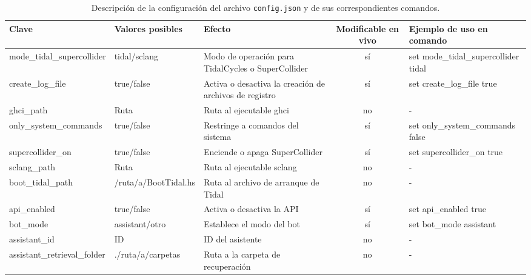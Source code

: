 \begin{landscape}
    \begin{table}[htbp]
        \centering
        \caption{Descripción de la configuración del archivo \texttt{config.json} y de sus correspondientes comandos.}
        \label{tab:config-description}
        \fontsize{9.5pt}{11pt}\selectfont
        \begin{tabularx}{\linewidth}{lXlcl}
            \toprule
            \rowcolor{azul_unir} %
            \textbf{Clave} & \textbf{Valores posibles} & \textbf{Efecto} & \textbf{Modificable en vivo} & \textbf{Ejemplo de uso en comando} \\
            \midrule
        mode\_tidal\_supercollider & tidal/sclang & Modo de operación para TidalCycles o SuperCollider & sí & set mode\_tidal\_supercollider tidal \\
        create\_log\_file & \textcolor{truecolor}{true}/\textcolor{falsecolor}{false} & Activa o desactiva la creación de archivos de registro & sí & set create\_log\_file \textcolor{truecolor}{true} \\
        ghci\_path & Ruta & Ruta al ejecutable ghci & no & - \\
        only\_system\_commands & \textcolor{truecolor}{true}/\textcolor{falsecolor}{false} & Restringe a comandos del sistema & sí & set only\_system\_commands \textcolor{falsecolor}{false} \\
        supercollider\_on & \textcolor{truecolor}{true}/\textcolor{falsecolor}{false} & Enciende o apaga SuperCollider & sí & set supercollider\_on \textcolor{truecolor}{true} \\
        sclang\_path & Ruta & Ruta al ejecutable sclang & no & - \\
        boot\_tidal\_path & \textcolor{pathcolor}{/ruta/a/BootTidal.hs} & Ruta al archivo de arranque de Tidal & no & - \\
        api\_enabled & \textcolor{truecolor}{true}/\textcolor{falsecolor}{false} & Activa o desactiva la API & sí & set api\_enabled \textcolor{truecolor}{true} \\
        bot\_mode & assistant/otro & Establece el modo del bot & sí & set bot\_mode assistant \\
        assistant\_id & ID & ID del asistente & no & - \\
        assistant\_retrieval\_folder & \textcolor{pathcolor}{./ruta/a/carpetas} & Ruta a la carpeta de recuperación & no & - \\

\end{tabularx}
\end{table}
\end{landscape}

